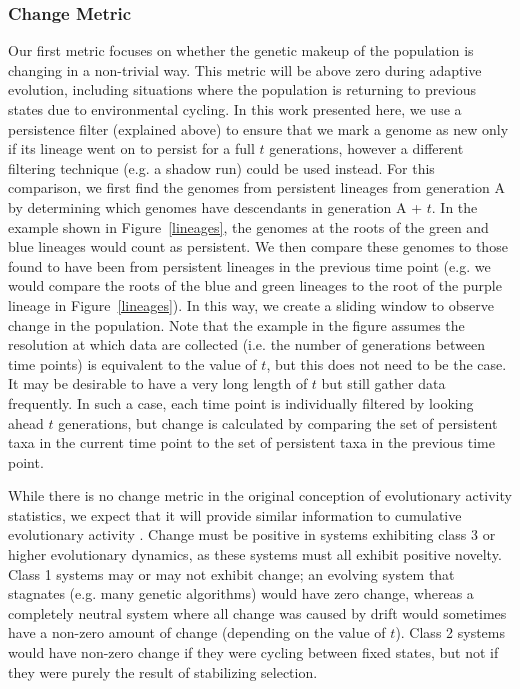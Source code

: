 \documentclass[letterpaper]{article}
\begin{document}
\subsubsection{Change Metric}
Our first metric focuses on whether the genetic makeup of the population is changing in a non-trivial way. This metric will be above zero %
during adaptive evolution, including situations where the population is returning to previous states due to environmental cycling.
In this work presented here, we use a persistence filter (explained above) to ensure that we mark a genome as new %
only if its lineage 
went on to persist for a
full $t$ generations, however a different filtering technique (e.g. a shadow run) could be used instead. For this comparison, we first find the genomes from persistent lineages from generation A by determining which genomes have descendants in generation A + $t$. In the example shown in Figure~\ref{lineages}, the genomes at the roots of the green and blue lineages would count as persistent. We then compare these genomes to those found to have been from persistent lineages in the previous time point (e.g. we would compare the roots of the blue and green lineages to the root of the purple lineage in Figure~\ref{lineages}). In this way, we create a sliding window to observe change in the population. Note that the example in the figure assumes the resolution at which data are collected (i.e. the number of generations between time points) is equivalent to the value of $t$, but this does not need to be the case. It may be desirable to have a very long length of $t$ but still gather data frequently. In such a case, each time point is individually filtered by looking ahead $t$ generations, but change is calculated by comparing the set of persistent taxa in the current time point to the set of persistent taxa in the previous time point. 

While there is no change metric in the original conception of evolutionary activity statistics, we expect that it will provide similar information to cumulative evolutionary activity \citep{bedau_comparison_1997}. Change must be positive in systems exhibiting class 3 or higher evolutionary dynamics, as these systems must all exhibit positive novelty. Class 1 systems may or may not exhibit change; an evolving system that stagnates (e.g. many genetic algorithms) would have zero change, whereas a completely neutral system where all change was caused by drift would sometimes have a non-zero amount of change (depending on the value of $t$). Class 2 systems would have non-zero change if they were cycling between fixed states, but not if they were purely the result of stabilizing selection.
\end{document}
